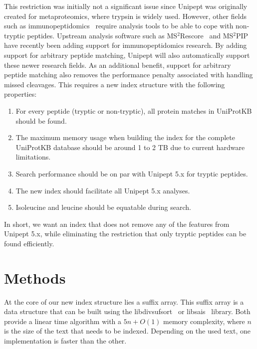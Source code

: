 \documentclass[11pt]{article}
\begin{document}
\begin{multicols}{2}
        This restriction was initially not a significant issue since Unipept was originally created for metaproteomics, where trypsin is widely used.
        However, other fields such as immunopeptidomics~\cite{immunopeptidomics} require analysis tools to be able to cope with non-tryptic peptides.
        Upstream analysis software such as MS$^2$Rescore~\cite{ms2rescore} and MS$^2$PIP~\cite{ms2pip} have recently been adding support for immunopeptidomics research.
        By adding support for arbitrary peptide matching, Unipept will also automatically support these newer research fields.
        As an additional benefit, support for arbitrary peptide matching also removes the performance penalty associated with handling missed cleavages.
        This requires a new index structure with the following properties:
        \begin{enumerate}
            \item For every peptide (tryptic or non-tryptic), all protein matches in UniProtKB should be found.
            \item The maximum memory usage when building the index for the complete UniProtKB database should be around 1 to 2 TB due to current hardware limitations.
            \item Search performance should be on par with Unipept 5.x for tryptic peptides.
            \item The new index should facilitate all Unipept 5.x analyses.
            \item Isoleucine and leucine should be equatable during search.
        \end{enumerate}
        In short, we want an index that does not remove any of the features from Unipept 5.x, while eliminating the restriction that only tryptic peptides can be found efficiently.


        \section{Methods}\label{sec:methods}
        At the core of our new index structure lies a suffix array.
        This suffix array is a data structure that can be built using the libdivsufsort~\cite{libdivsufsort} or libsais~\cite{libsais} library.
        Both provide a linear time algorithm with a $5n + O(1)$ memory complexity, where $n$ is the size of the text that needs to be indexed.
        Depending on the used text, one implementation is faster than the other.


\end{multicols}
\end{document}
